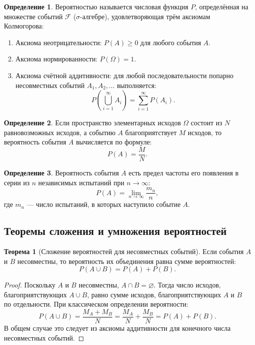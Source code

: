 \documentclass[a4paper]{article}
\theoremstyle{definition}
\newtheorem{definition}{Определение}[subsection]
\newtheorem{theorem}{Теорема}[subsection]
\begin{document}
\begin{definition}
Вероятностью называется числовая функция $P$, определённая на множестве событий $\mathcal{F}$ ($\sigma$-алгебре), удовлетворяющая трём аксиомам Колмогорова:
\begin{enumerate}
    \item Аксиома неотрицательности: $P(A) \ge 0$ для любого события $A$.
    \item Аксиома нормированности: $P(\Omega) = 1$.
    \item Аксиома счётной аддитивности: для любой последовательности попарно несовместных событий $A_1, A_2, \dots$ выполняется:
    \[
    P\left(\bigcup_{i=1}^{\infty} A_i\right) = \sum_{i=1}^{\infty} P(A_i).
    \]
\end{enumerate}
\end{definition}

\begin{definition}
Если пространство элементарных исходов $\Omega$ состоит из $N$ равновозможных исходов, а событию $A$ благоприятствует $M$ исходов, то вероятность события $A$ вычисляется по формуле:
\begin{equation}
    P(A) = \frac{M}{N}. \tag{1}
\end{equation}
\end{definition}

\begin{definition}
Вероятность события $A$ есть предел частоты его появления в серии из $n$ независимых испытаний при $n \to \infty$:
\begin{equation}
    P(A) = \lim_{n \to \infty} \frac{m_n}{n}, \tag{2}
\end{equation}
где $m_n$ — число испытаний, в которых наступило событие $A$.
\end{definition}

\subsection{Теоремы сложения и умножения вероятностей}

\begin{theorem}[Сложение вероятностей для несовместных событий]
Если события $A$ и $B$ несовместны, то вероятность их объединения равна сумме вероятностей:
\begin{equation}
    P(A \cup B) = P(A) + P(B). \tag{3}
\end{equation}
\end{theorem}

\begin{proof}
Поскольку $A$ и $B$ несовместны, $A \cap B = \varnothing$. Тогда число исходов, благоприятствующих $A \cup B$, равно сумме исходов, благоприятствующих $A$ и $B$ по отдельности. При классическом определении вероятности:
\[
P(A \cup B) = \frac{M_A + M_B}{N} = \frac{M_A}{N} + \frac{M_B}{N} = P(A) + P(B).
\]
В общем случае это следует из аксиомы аддитивности для конечного числа несовместных событий.
\end{proof}
\end{document}
